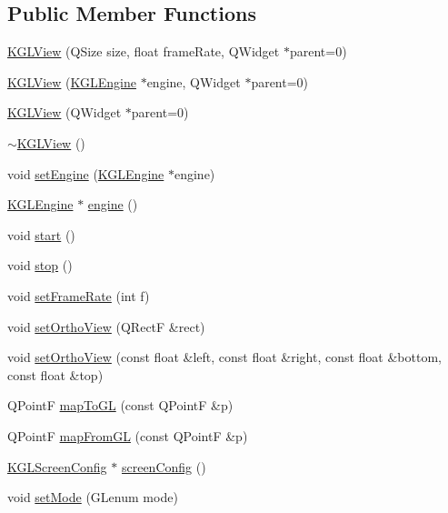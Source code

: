 \subsection*{Public Member Functions}
\begin{CompactItemize}
\item 
\hyperlink{class_k_g_l_view_8ea742580ef43e3fc2dae57c6c49702b}{KGLView} (QSize size, float frameRate, QWidget $\ast$parent=0)
\item 
\hyperlink{class_k_g_l_view_b9286be5ea42882a1bc74e0d09911e0d}{KGLView} (\hyperlink{class_k_g_l_engine}{KGLEngine} $\ast$engine, QWidget $\ast$parent=0)
\item 
\hyperlink{class_k_g_l_view_986c271786b4615af0e6f49e9de8c58d}{KGLView} (QWidget $\ast$parent=0)
\item 
\hyperlink{class_k_g_l_view_78519d715936803fdec2fad8f1d3c7a3}{$\sim$KGLView} ()
\item 
void \hyperlink{class_k_g_l_view_61cfd521e7544d61d7531b29702f9833}{setEngine} (\hyperlink{class_k_g_l_engine}{KGLEngine} $\ast$engine)
\item 
\hyperlink{class_k_g_l_engine}{KGLEngine} $\ast$ \hyperlink{class_k_g_l_view_e426a41ab8a5565bf7bfd861f05cfb46}{engine} ()
\item 
void \hyperlink{class_k_g_l_view_3efd71e05da0e8ee7410ced9f1061090}{start} ()
\item 
void \hyperlink{class_k_g_l_view_bfe4d0dd939222de9c9d4aa8c091b302}{stop} ()
\item 
void \hyperlink{class_k_g_l_view_65ccc66131b6682f5fce7166cb5a4f53}{setFrameRate} (int f)
\item 
void \hyperlink{class_k_g_l_view_841482c1c522ea0fd6d0cbb7f8515613}{setOrthoView} (QRectF \&rect)
\item 
void \hyperlink{class_k_g_l_view_ffc9ca060284bb6f24f2c415710f7b35}{setOrthoView} (const float \&left, const float \&right, const float \&bottom, const float \&top)
\item 
QPointF \hyperlink{class_k_g_l_view_b5d64f06b3602a0ca6ff41d71fc65aa3}{mapToGL} (const QPointF \&p)
\item 
QPointF \hyperlink{class_k_g_l_view_7afa395fcb499b10cd3303e9dede9cef}{mapFromGL} (const QPointF \&p)
\item 
\hyperlink{class_k_g_l_screen_config}{KGLScreenConfig} $\ast$ \hyperlink{class_k_g_l_view_ead550d304e10d08fdaa06416b53d7cf}{screenConfig} ()
\item 
void \hyperlink{class_k_g_l_view_ec41126c626102bf54b1188714fc4a4f}{setMode} (GLenum mode)

\end{CompactItemize}
